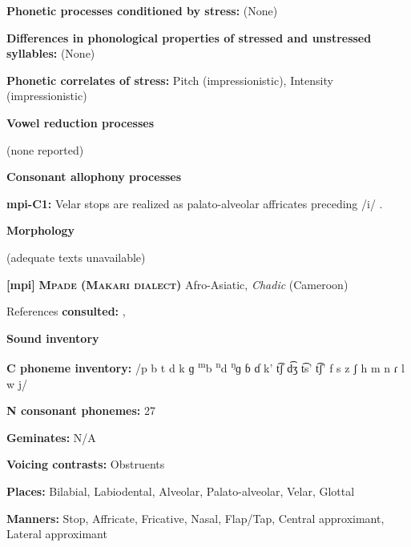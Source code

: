 \textbf{Phonetic processes conditioned by stress:} (None)



\textbf{Differences in phonological properties of stressed and unstressed syllables:} (None)



\textbf{Phonetic correlates of stress:} Pitch (impressionistic), Intensity (impressionistic)



\textbf{Vowel reduction processes}



(none reported)



\textbf{Consonant allophony processes}



\textbf{mpi-C1:} Velar stops are realized as palato-alveolar affricates preceding /i/ \citep{Allison2012}.



\textbf{Morphology}



(adequate texts unavailable)



\textbf{[mpi]}   \textbf{\textsc{Mpade (Makari dialect)}}  Afro-Asiatic, \textit{Chadic} (Cameroon)



References \textbf{consulted:} \citet{Allison2012}, \citet{Mahamat2005}



\textbf{Sound inventory}



\textbf{C phoneme inventory:} /p b t d k ɡ \textsuperscript{m}b \textsuperscript{n}d \textsuperscript{ŋ}ɡ ɓ ɗ k’ t͡ʃ d͡ʒ t͡s’ t͡ʃ’ f s z ʃ h m n ɾ l w j/



\textbf{N consonant phonemes:} 27



\textbf{Geminates:} N/A



\textbf{Voicing contrasts:} Obstruents



\textbf{Places:} Bilabial, Labiodental, Alveolar, Palato-alveolar, Velar, Glottal



\textbf{Manners:} Stop, Affricate, Fricative, Nasal, Flap/Tap, Central approximant, Lateral approximant



